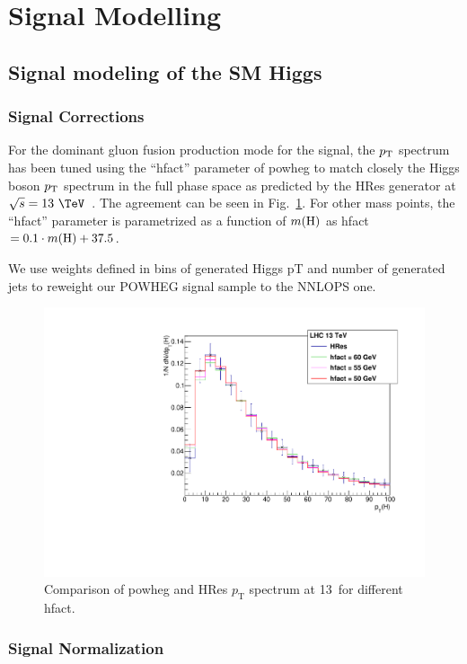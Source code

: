 \section{Signal Modelling}
\label{sec:signalmodelling}

\subsection{Signal modeling of the SM Higgs}
\subsubsection{Signal Corrections}
\label{sec:signalcorr}

For the dominant gluon fusion production mode for the signal, the $p_{\rm T}$ spectrum has been tuned using 
the ``hfact'' parameter of {\sc powheg} to match closely the Higgs boson $p_{\rm T}$ spectrum in the full phase 
space as predicted by the {\sc HRes} generator at $\sqrt{s}=13~\TeV$~\cite{powhfact}. The agreement can be seen in Fig.~\ref{fig:PowhegHResPt}. 
For other mass points, the ``hfact'' parameter is parametrized as a function of $m(\rm{H})$ as hfact$=0.1\cdot m({\rm H})+37.5$.

We use weights defined in bins of generated Higgs pT and number of generated jets to reweight our POWHEG signal sample to the NNLOPS one.

\begin{figure}[!h]
\centering
\includegraphics[width=0.6\linewidth]{Figures/Modelling/HResPOWHEGTuning.pdf}
\caption{Comparison of {\sc powheg} and {\sc HRes} $p_{\mathrm{T}}$ spectrum at 13~\TeV for different hfact. \label{fig:PowhegHResPt}}
\end{figure}


\subsubsection{Signal Normalization}
\label{sec:signalnorm}


